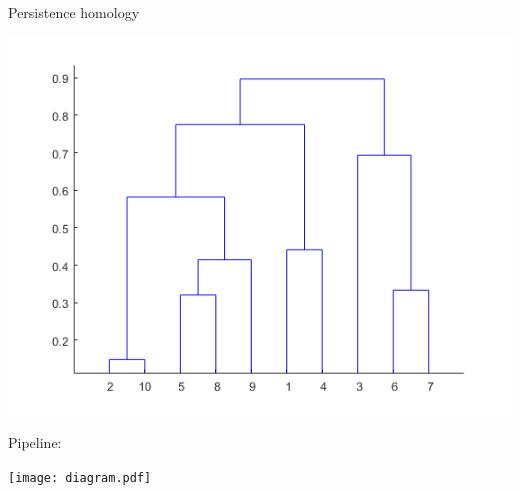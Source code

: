 \documentclass[10pt,t, handout]{beamer} %
\begin{document}
\begin{frame}{Persistence homology}
	\begin{center}
		\includegraphics[scale=.2]{dendogram}
	\end{center}

	\pause
	\vskip -10pt
	
	\textcolor{pblue}{Pipeline:}
	\begin{center}
		\texttt{[image: diagram.pdf]}
	\end{center}
\end{frame}
\end{document}
